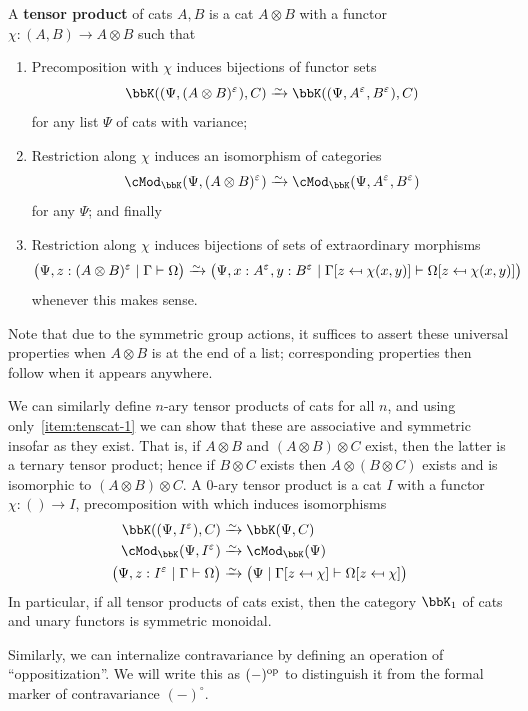 \documentclass{amsart}
\newcommand{\K}{\bbK}
\let\mod\cMod
\def\modk{\mod_\K}
\renewcommand{\o}{^{\circ}}
\newcommand{\e}[1][]{^{\varepsilon_{#1}}}
\let\mto\vdash    %
\def\mhomc#1#2#3{\left( #1 \mid #2 \vphantom{\big|}\mto #3 \right)}
\newcommand{\subst}[3]{{#1}[#2 \mapsfrom #3]}
\begin{document}
\begin{defn}\label{defn:tens-cat}
  A \textbf{tensor product} of cats $A,B$ is a cat $A\otimes B$ with a functor $\chi:(A,B) \to A\otimes B$ such that
  \begin{enumerate}
  \item Precomposition with $\chi$ induces bijections of functor sets
    \[ \K((\Psi,(A\otimes B)\e),C) \toiso \K((\Psi,A\e,B\e),C)\]
    for any list $\Psi$ of cats with variance;\label{item:tenscat-1}
  \item Restriction along $\chi$ induces an isomorphism of categories
    \[ \modk(\Psi,(A\otimes B)\e) \toiso \modk(\Psi,A\e,B\e) \]
    for any $\Psi$; and finally
  \item Restriction along $\chi$ induces bijections of sets of extraordinary morphisms
    \[ \mhomc{\Psi,z:(A\otimes B)\e}{\Gamma}{\Omega}\toiso \mhomc{\Psi,x:A\e,y:B\e}{\subst\Gamma z{\chi(x,y)}}{\subst \Omega z {\chi(x,y)}}\]
    whenever this makes sense.\label{item:tenscat-3}
  \end{enumerate}
\end{defn}

Note that due to the symmetric group actions, it suffices to assert these universal properties when $A\otimes B$ is at the end of a list; corresponding properties then follow when it appears anywhere.

We can similarly define $n$-ary tensor products of cats for all $n$, and using only~\ref{item:tenscat-1} we can show that these are associative and symmetric insofar as they exist.
That is, if $A\otimes B$ and $(A\otimes B)\otimes C$ exist, then the latter is a ternary tensor product; hence if $B\otimes C$ exists then $A\otimes (B\otimes C)$ exists and is isomorphic to $(A\otimes B)\otimes C$.
A 0-ary tensor product is a cat $I$ with a functor $\chi:()\to I$, precomposition with which induces isomorphisms
\begin{align*}
  \K((\Psi,I\e),C) &\toiso \K(\Psi,C)\\
  \modk(\Psi,I\e) &\toiso \modk(\Psi)\\
  \mhomc{\Psi,z:I\e}{\Gamma}{\Omega} &\toiso \mhomc{\Psi}{\subst\Gamma z\chi}{\subst\Omega z \chi}
\end{align*}
In particular, if all tensor products of cats exist, then the category $\K_1$ of cats and unary functors is symmetric monoidal.

Similarly, we can internalize contravariance by defining an operation of ``oppositization''.
We will write this as $(-)^{\mathrm{op}}$ to distinguish it from the formal marker of contravariance $(-)\o$.
\end{document}
